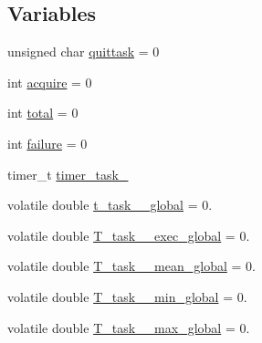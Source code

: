 \subsection*{Variables}
\begin{DoxyCompactItemize}
\item 
unsigned char \hyperlink{main2_01_07C_xC3_xB3pia_01em_01conflito_01de_01Caio_01Gustavo_01Mesquita_01Angelo_012013-04-28_08_8c_a525dcecf4685bea1fbf92651ac0401fe}{quittask} = 0
\item 
int \hyperlink{main2_01_07C_xC3_xB3pia_01em_01conflito_01de_01Caio_01Gustavo_01Mesquita_01Angelo_012013-04-28_08_8c_a95a859aa805a58cd4c59e172d250de4a}{acquire} = 0
\item 
int \hyperlink{main2_01_07C_xC3_xB3pia_01em_01conflito_01de_01Caio_01Gustavo_01Mesquita_01Angelo_012013-04-28_08_8c_ac7af894858cf396a219d632f40afdc8d}{total} = 0
\item 
int \hyperlink{main2_01_07C_xC3_xB3pia_01em_01conflito_01de_01Caio_01Gustavo_01Mesquita_01Angelo_012013-04-28_08_8c_a4f35e5ea2395561d0bd3b2f45612dc2c}{failure} = 0
\item 
timer\-\_\-t \hyperlink{main2_01_07C_xC3_xB3pia_01em_01conflito_01de_01Caio_01Gustavo_01Mesquita_01Angelo_012013-04-28_08_8c_a904a157c5d5f94416cd450f511635af1}{timer\-\_\-task\-\_}
\item 
volatile double \hyperlink{main2_01_07C_xC3_xB3pia_01em_01conflito_01de_01Caio_01Gustavo_01Mesquita_01Angelo_012013-04-28_08_8c_a2a2a647912528f7aa86812528dbfe02f}{t\-\_\-task\-\_\-\_\-global} = 0.
\item 
volatile double \hyperlink{main2_01_07C_xC3_xB3pia_01em_01conflito_01de_01Caio_01Gustavo_01Mesquita_01Angelo_012013-04-28_08_8c_acdaa4a9b0e1be3dfa53b52df6410ad3b}{T\-\_\-task\-\_\-\_\-exec\-\_\-global} = 0.
\item 
volatile double \hyperlink{main2_01_07C_xC3_xB3pia_01em_01conflito_01de_01Caio_01Gustavo_01Mesquita_01Angelo_012013-04-28_08_8c_a738c330c86a365e72ce29ebca3f1e572}{T\-\_\-task\-\_\-\_\-mean\-\_\-global} = 0.
\item 
volatile double \hyperlink{main2_01_07C_xC3_xB3pia_01em_01conflito_01de_01Caio_01Gustavo_01Mesquita_01Angelo_012013-04-28_08_8c_a86222e255aeeb47598a4fc91ab6c2b1a}{T\-\_\-task\-\_\-\_\-min\-\_\-global} = 0.
\item 
volatile double \hyperlink{main2_01_07C_xC3_xB3pia_01em_01conflito_01de_01Caio_01Gustavo_01Mesquita_01Angelo_012013-04-28_08_8c_aa714e30d738039b5bf665742beb31739}{T\-\_\-task\-\_\-\_\-max\-\_\-global} = 0.

\end{DoxyCompactItemize}
